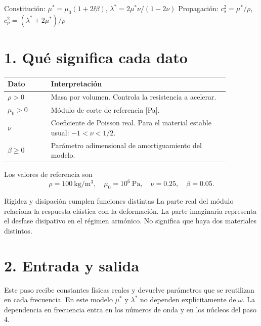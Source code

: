 \documentclass[11pt]{article}
\begin{document}
\base
{}
{Constitución: \(\mu^*=\mu_0(1+2\ii\beta)\), \(\lambda^*=2\mu^*\nu/(1-2\nu)\)}
{Propagación: \(c_s^2=\mu^*/\rho\), \(c_p^2=(\lambda^*+2\mu^*)/\rho\)}

\section*{1. Qué significa cada dato}
\begin{center}
\begin{tabular}{p{0.17\linewidth}p{0.70\linewidth}}
\toprule
Dato & Interpretación\\
\midrule
\(\rho>0\) & Masa por volumen. Controla la resistencia a acelerar.\\
\(\mu_0>0\) & Módulo de corte de referencia [Pa].\\
\(\nu\) & Coeficiente de Poisson real. Para el material estable usual:
\(-1<\nu<1/2\).\\
\(\beta\ge0\) & Parámetro adimensional de amortiguamiento del modelo.\\
\bottomrule
\end{tabular}
\end{center}
Los valores de referencia son
\[
 \rho=100\ \mathrm{kg/m^3},\quad \mu_0=10^6\ \mathrm{Pa},\quad
 \nu=0.25,\quad\beta=0.05.
\]
\begin{idea}{Rigidez y disipación cumplen funciones distintas}
La parte real del módulo relaciona la respuesta elástica con la deformación.
La parte imaginaria representa el desfase disipativo en el régimen armónico.
No significa que haya dos materiales distintos.
\end{idea}

\section*{2. Entrada y salida}
Este paso recibe constantes físicas reales y devuelve parámetros que se
reutilizan en cada frecuencia. En este modelo \(\mu^*\) y \(\lambda^*\) no
dependen explícitamente de \(\omega\). La dependencia en frecuencia entra en
los números de onda y en los núcleos del paso 4.

\newpage
\end{document}
